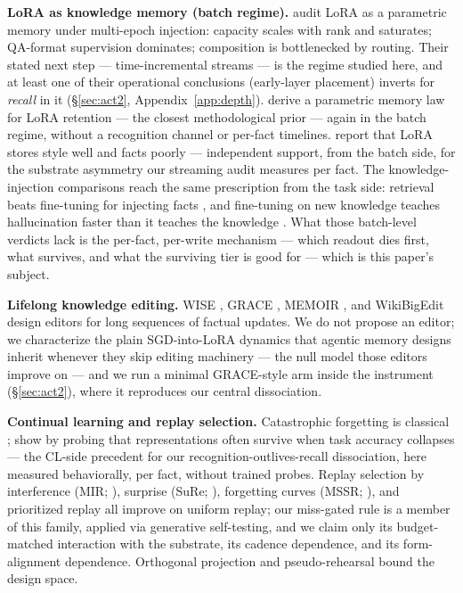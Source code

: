 \documentclass[11pt]{article}
\begin{document}
\textbf{LoRA as knowledge memory (batch regime).} \citet{back2026lora} audit LoRA as a parametric
memory under multi-epoch injection: capacity scales with rank and saturates; QA-format supervision
dominates; composition is bottlenecked by routing. Their stated next step --- time-incremental
streams --- is the regime studied here, and at least one of their operational conclusions
(early-layer placement) inverts for \emph{recall} in it (\S\ref{sec:act2},
Appendix~\ref{app:depth}). \citet{xu2026lora} derive a parametric memory law for LoRA retention
--- the closest methodological prior --- again in the batch regime, without a recognition channel
or per-fact timelines. \citet{substrate2026} report that LoRA stores style well and facts poorly
--- independent support, from the batch side, for the substrate asymmetry our streaming audit
measures per fact. The knowledge-injection comparisons reach the same prescription from the
task side: retrieval beats fine-tuning for injecting facts \citep{ovadia2023injection}, and
fine-tuning on new knowledge teaches hallucination faster than it teaches the knowledge
\citep{gekhman2024finetuning}. What those batch-level verdicts lack is the per-fact,
per-write mechanism --- which readout dies first, what survives, and what the surviving tier
is good for --- which is this paper's subject.

\textbf{Lifelong knowledge editing.} WISE \citep{wang2024wise}, GRACE \citep{hartvigsen2022grace},
MEMOIR \citep{wang2025memoir}, and WikiBigEdit \citep{thede2025wikibigedit} design editors for
long sequences of factual updates. We do not propose an editor; we characterize the plain
SGD-into-LoRA dynamics that agentic memory designs inherit whenever they skip editing machinery
--- the null model those editors improve on --- and we run a minimal GRACE-style arm inside the
instrument (\S\ref{sec:act2}), where it reproduces our central dissociation.

\textbf{Continual learning and replay selection.} Catastrophic forgetting is classical
\citep{mccloskey1989,kirkpatrick2017}; \citet{davari2022probing} show by probing that
representations often survive when task accuracy collapses --- the CL-side precedent for our
recognition-outlives-recall dissociation, here measured behaviorally, per fact, without trained
probes. Replay selection by interference (MIR;
\citealt{aljundi2019mir}), surprise (SuRe; \citealt{sure2025}), forgetting curves (MSSR;
\citealt{mssr2026}), and prioritized replay \citep{schaul2015} all improve on uniform replay; our
miss-gated rule is a member of this family, applied via generative self-testing, and we claim
only its budget-matched interaction with the substrate, its cadence dependence, and its
form-alignment dependence. Orthogonal projection \citep{farajtabar2020ogd} and pseudo-rehearsal
\citep{robins1995} bound the design space.
\end{document}
